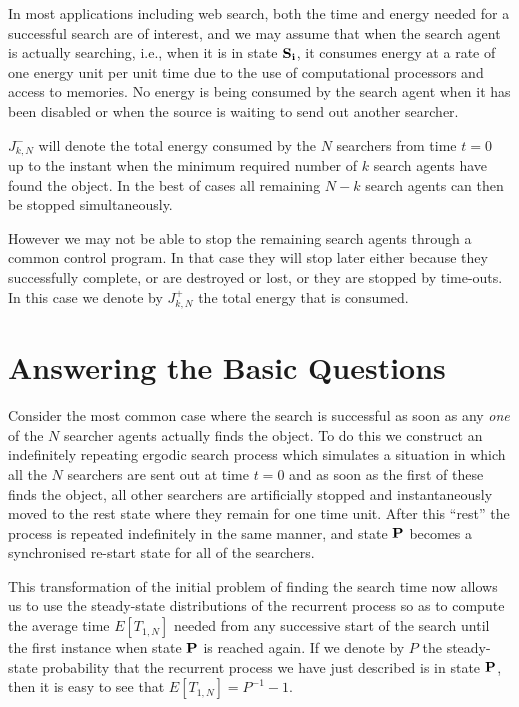 \documentclass[journal]{IEEEtran}
\begin{document}
In most applications including web search, both the time and energy needed for a successful search are of interest, and we may assume that when the search agent is actually searching, i.e.,
when it is in state $\bf S_i$, it consumes energy at a rate of one energy unit per unit time
due to the use of computational processors and access to memories.
No energy is being consumed by the  search agent when it has been disabled or when the source is waiting to send out another searcher.

$J_{k,N}^-$ will denote the total energy consumed by the $N$ searchers from time $t=0$ up to the instant when
the minimum
required number of $k$ search agents have found the object. In the best of cases all remaining $N-k$ search agents can then be stopped simultaneously.

However we may not be able to stop the remaining search agents
through a common control program. In that case they will stop later either because they successfully complete, or are destroyed or lost, or they are stopped by time-outs. In this case we denote by  $J_{k,N}^+$ the total energy that is consumed.


\section{Answering the Basic Questions}\label{avg-comput}

Consider the most common case where the search is successful as soon as any {\em one} of the $N$ searcher agents actually finds the object.
To do this we construct an
indefinitely repeating ergodic search process which simulates a situation in which all the $N$ searchers are sent out at time $t=0$ and as soon as the first of these  finds the object, all other searchers are artificially stopped and instantaneously moved to the rest state where they remain for one time unit. After this ``rest''  the process is repeated indefinitely in the same manner, and state $\bf P$ becomes a synchronised re-start state for all of the searchers.

This transformation of the initial problem of finding the search time now allows us to use the steady-state distributions of the recurrent process so as to compute the average time $E[T_{1,N}]$ needed from any successive start of the search until the first instance when state $\bf P$ is reached again. If we denote by $P$ the steady-state probability that the recurrent process we have just described is in state $\bf P$, then it is easy to see that $E[T_{1,N}] = P^{-1}-1$.
\end{document}
